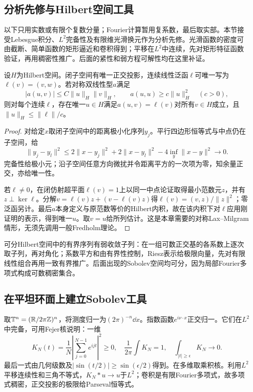 \subsection*{分析先修与Hilbert空间工具}
以下只用实数或有限个复数分量；Fourier计算暂用复系数，最后取实部。本节接受Lebesgue积分、$L^2$完备性及有限维光滑换元作为分析先修。光滑函数的密度可由截断、简单函数的矩形逼近和卷积得到；平移在$L^2$中连续，先对矩形特征函数验证，再用稠密性推广。后面的紧性和弱方程可解性均在这里补证。

\begin{lemma}\label{lem:hilbert-variational}
设$H$为Hilbert空间。闭子空间有唯一正交投影，连续线性泛函$\ell$可唯一写为$\ell(v)=(v,w)$。若对称双线性型$a$满足
\[
 |a(u,v)|\leq C\|u\|_H\|v\|_H,\qquad
 a(u,u)\geq c\|u\|_H^2\quad(c>0),
\]
则对每个连续$\ell$，存在唯一$u\in H$满足$a(u,v)=\ell(v)$对所有$v\in H$成立，且$\|u\|_H\leq\|\ell\|/c$。
\end{lemma}
\begin{proof}
对给定$x$取闭子空间中的距离极小化序列$y_j$。平行四边形恒等式与中点仍在子空间，给
\[
 \|y_j-y_l\|^2\leq
 2\|x-y_j\|^2+2\|x-y_l\|^2-4\inf_y\|x-y\|^2\longrightarrow0.
\]
完备性给极小元；沿子空间任意方向微扰并令距离平方的一次项为零，知余量正交，亦给唯一性。

若$\ell\ne0$，在闭仿射超平面$\ell(v)=1$上以同一中点论证取得最小范数元$z$，并有$z\perp\ker\ell$。分解$v=\ell(v)z+(v-\ell(v)z)$得$\ell(v)=(v,z)/\|z\|^2$；零泛函另计。最后$a$本身定义与原范数等价的Hilbert内积，故在该内积下对$\ell$应用刚证明的表示，得到唯一$u$。取$v=u$给所列估计。这是本章需要的对称Lax--Milgram情形，无须先调用一般Fredholm理论。
\end{proof}

可分Hilbert空间中的有界序列有弱收敛子列：在一组可数正交基的各系数上逐次取子列，再对角化；系数平方和由有界性控制，Riesz表示给极限向量，先对有限线性组合再用一致有界推广。后面出现的Sobolev空间均可分，因为局部Fourier多项式构成可数稠密集合。

\subsection*{在平坦环面上建立Sobolev工具}
取$\mathbb T^n=(\mathbb{R}/2\pi\mathbb Z)^n$，将测度归一为$(2\pi)^{-n}\dd x$。指数函数$e^{i\nu\cdot x}$正交归一。它们在$L^2$中完备，可用Fejer核说明：一维
\[
 K_N(t)=\frac1N\left|\sum_{j=0}^{N-1}e^{ijt}\right|^2\geq0,
 \quad\frac1{2\pi}\int K_N=1,
 \quad\int_{|t|\geq\epsilon}K_N\longrightarrow0.
\]
最后一式由几何级数及$|\sin(t/2)|\geq\sin(\epsilon/2)$得到。在多维取乘积核。利用$L^2$平移连续性和三角不等式，$K_N*u\to u$于$L^2$；卷积是有限Fourier多项式，故多项式稠密，正交投影的极限给Parseval恒等式。

